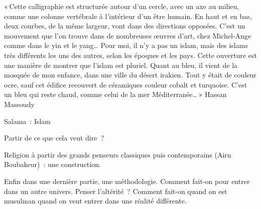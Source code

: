 « Cette calligraphie est structurée autour d'un cercle, avec un axe au
milieu, comme une colonne vertébrale à l'intérieur d'un être humain. En
haut et en bas, deux courbes, de la même largeur, vont dans des
directions opposées. C'est un mouvement que l'on trouve dans de
nombreuses œuvres d'art, chez Michel-Ange comme dans le yin et le
yang\ldots{} Pour moi, il n'y a pas un islam, mais des islams très
différents les uns des autres, selon les époques et les pays. Cette
ouverture est une manière de montrer que l'islam est pluriel. Quant au
bleu, il vient de la mosquée de mon enfance, dans une ville du désert
irakien. Tout y était de couleur ocre, sauf cet édifice recouvert de
céramiques couleur cobalt et turquoise. C'est un bleu qui reste chaud,
comme celui de la mer Méditerranée\ldots{} » Hassan Massoudy



Salama~: Islam

Partir de ce que cela veut dire~?

Religion à partir des grands penseurs classiques puis contemporains
(Airn Boubakeur)~: une construction.

Enfin dans une dernière partie, une méthodologie. Comment fait-on pour
entrer dans un autre univers. Penser l'altérité~? Comment fait-on quand
on est musulman quand on veut entrer dans une réalité différente.





